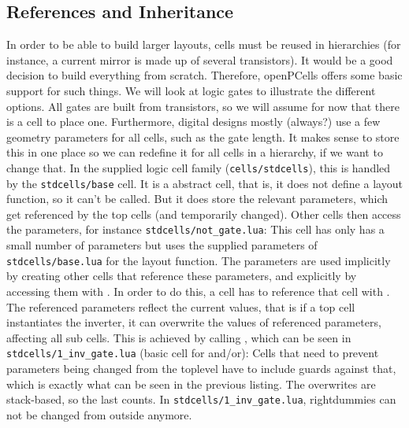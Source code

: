 \subsection{References and Inheritance}
In order to be able to build larger layouts, cells must be reused in hierarchies (for instance, a current mirror is made up of several transistors). It would be
a good decision to build everything from scratch. Therefore, openPCells offers some basic support for such things. We will look at logic gates to illustrate the
different options. All gates are built from transistors, so we will assume for now that there is a cell to place one. Furthermore, digital designs mostly
(always?) use a few geometry parameters for all cells, such as the gate length. It makes sense to store this in one place so we can redefine it for all cells in
a hierarchy, if we want to change that. In the supplied logic cell family (\texttt{cells/stdcells}), this is handled by the \texttt{stdcells/base} cell. It is a abstract
cell, that is, it does not define a layout function, so it can't be called. But it does store the relevant parameters, which get referenced by the top cells (and
temporarily changed). Other cells then access the parameters, for instance \texttt{stdcells/not\_gate.lua}:
This cell has only has a small number of parameters but uses the supplied parameters of \texttt{stdcells/base.lua} for the layout function. The parameters are used
implicitly by creating other cells that reference these parameters, and explicitly by accessing them with . In order to do this,
a cell has to reference that cell with . The referenced parameters reflect the current values, that is if a top cell instantiates the
inverter, it can overwrite the values of referenced parameters, affecting all sub cells. This is achieved by calling , which can
be seen in \texttt{stdcells/1\_inv\_gate.lua} (basic cell for and/or):
Cells that need to prevent parameters being changed from the toplevel have to include guards against that, which is exactly what can be seen in the previous
listing. The overwrites are stack-based, so the last  counts. In \texttt{stdcells/1\_inv\_gate.lua}, rightdummies can not be changed from
outside anymore.
